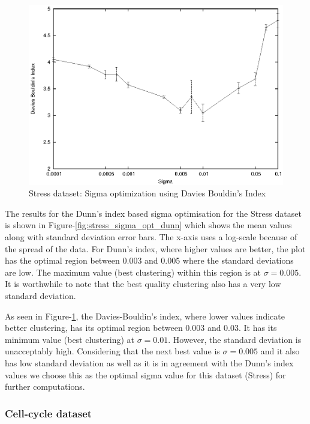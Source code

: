 \begin{figure}[p]
 \centering
 \includegraphics[scale=1.0]{images_only/semisup/results/plots/stress_davies.eps}
 \caption{Stress dataset: Sigma optimization using Davies Bouldin's Index}
 \label{fig:stress_sigma_opt_dav}
\end{figure}

The results for the Dunn's index based sigma optimisation for the Stress dataset is shown in Figure-\ref{fig:stress_sigma_opt_dunn} which shows the mean values along with standard deviation error bars. 
The x-axis uses a log-scale because of the spread of the data.  For Dunn's index, where higher values are better, the plot has the optimal region between 0.003 and 0.005 where the 
standard deviations are low.
The maximum value (best clustering) within this region is at $\sigma=0.005$. It is worthwhile to note that the best quality 
clustering also has a very low standard deviation.

As seen in Figure-\ref{fig:stress_sigma_opt_dav}, the Davies-Bouldin's index, where lower values indicate better clustering, has its optimal region between 0.003 and 0.03. It has its minimum value (best clustering) at $\sigma=0.01$. However, the standard deviation is unacceptably high.
Considering that the next best value is $\sigma=0.005$ and it also has low standard deviation as well as it is in agreement with the Dunn's index values we 
choose this as the optimal sigma value for this dataset (Stress) for further computations.  

\subsubsection{Cell-cycle dataset}

